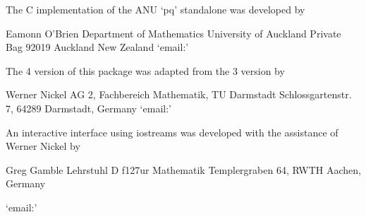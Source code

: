 
The C implementation of the ANU `pq' standalone was developed by

\begintt
Eamonn O'Brien
Department of Mathematics
University of Auckland
Private Bag 92019
Auckland
New Zealand
\endtt
{}`email:' 

The {\GAP} 4 version of this package was adapted from the {\GAP} 3
version by  

\begintt
Werner Nickel
AG 2, Fachbereich Mathematik, TU Darmstadt
Schlossgartenstr. 7, 64289 Darmstadt, Germany
\endtt
{}`email:' 

An  interactive  interface  using  iostreams  was  developed   with   the
assistance of Werner Nickel by

{}Greg Gamble
Lehrstuhl D f\accent127ur Mathematik
Templergraben 64, RWTH Aachen, Germany

{}`email:' 


